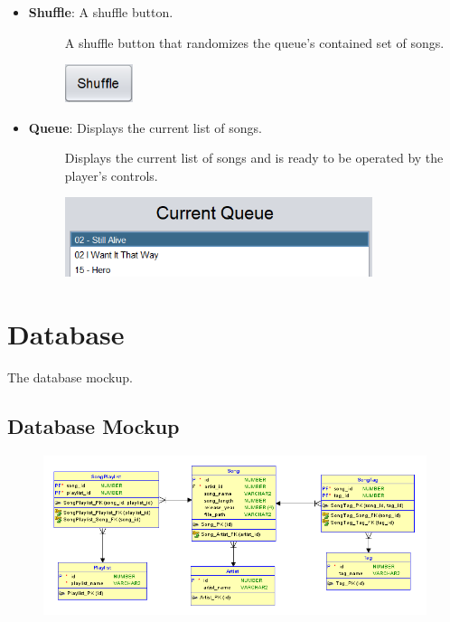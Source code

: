 \documentclass{article}
\begin{document}
\begin{itemize}
    \item \textbf{Shuffle}: A shuffle button.
    \begin{description}
        \item[] A shuffle button that randomizes the queue's contained set of songs.
        \item[] \includegraphics[width=2cm]{Images/Shuffle.png}
    \end{description}
    \item \textbf{Queue}: Displays the current list of songs.
        \begin{description}
        \item[] Displays the current list of songs and is ready to be operated by the player's controls.
        \item[] \includegraphics[width=9cm]{Images/CurrentQueue.png}
        \end{description}
\end{itemize}

\vspace{0.5cm}

\section{Database}
\quad The database mockup.

\subsection{Database Mockup}

\begin{figure}[h]
\includegraphics[width=18cm]{Images/AMP_DB_Mockup.PNG}
\end{figure}
\end{document}
